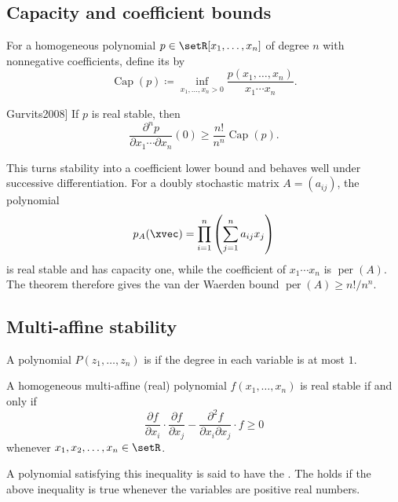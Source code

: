 \subsection[gurvitsCapacity]{Capacity and coefficient bounds}

For a homogeneous polynomial $p\in\setR[x_1,\dotsc,x_n]$ of degree $n$ with
nonnegative coefficients, define its \label{stableCapacity} by
\[
  \operatorname{Cap}(p)
  \coloneqq
  \inf_{x_1,\dotsc,x_n>0}\frac{p(x_1,\dotsc,x_n)}{x_1\dotsm x_n}.
\]

\begin{theorem}[Gurvits, \cite[Thm.~2.4 and Cor.~2.5]{Gurvits2008}]
If $p$ is real stable, then
\[
  \frac{\partial^n p}{\partial x_1\dotsm\partial x_n}(0)
  \geq \frac{n!}{n^n}\operatorname{Cap}(p).
\]
\end{theorem}

This turns stability into a coefficient lower bound and behaves well under
successive differentiation.  For a doubly stochastic matrix
$A=(a_{ij})$, the polynomial
\[
  p_A(\xvec)=\prod_{i=1}^n\left(\sum_{j=1}^n a_{ij}x_j\right)
\]
is real stable and has capacity one, while the coefficient of
$x_1\dotsm x_n$ is $\operatorname{per}(A)$.  The theorem therefore gives the
van der Waerden bound $\operatorname{per}(A)\geq n!/n^n$.



\subsection[stabilitymultiaffine]{Multi-affine stability}

A polynomial $P(z_1,\dotsc,z_n)$ is
\label{multiAffinePolynomial}
if the degree in each variable is at most $1$.



\begin{theorem}
A homogeneous multi-affine (real) polynomial $f(x_1,\dotsc,x_n)$ is real
stable if and only if
\[
 \frac{\partial f}{\partial x_i} \cdot \frac{\partial f}{\partial x_j} -
 \frac{\partial^2 f}{\partial x_i \partial x_j} \cdot f \geq 0
\]
whenever $x_1,x_2,\dotsc,x_n \in \setR$.
\end{theorem}
A polynomial satisfying this inequality is said to have the
\label{stronglyRayleighProperty}.
The \label{weakRayleighProperty}
holds if the above inequality is true whenever the variables are positive
real numbers.


